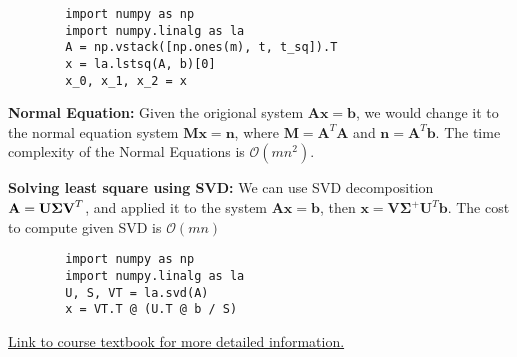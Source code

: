 \documentclass[12pt]{article}
\begin{document}
\begin{verbatim}
        import numpy as np
        import numpy.linalg as la
        A = np.vstack([np.ones(m), t, t_sq]).T
        x = la.lstsq(A, b)[0]
        x_0, x_1, x_2 = x
\end{verbatim}

\medskip
\noindent \textbf{Normal Equation:} Given the origional system $\mathbf{Ax} = \mathbf{b}$, we would change it to the normal equation system $\mathbf{Mx} = \mathbf{n}$, where $\mathbf{M} = \mathbf{A}^T \mathbf{A}$ and $\mathbf{n} = \mathbf{A}^T\mathbf{b}$. The time complexity of the Normal Equations is $\mathcal{O}(mn^2)$.

\medskip
\noindent \textbf{Solving least square using SVD:} We can use SVD decomposition ${\bf A} = {\bf U \Sigma V}^T$, and applied it to the system $\mathbf{Ax} = \mathbf{b}$, then $\mathbf{x} = \mathbf{V \Sigma}^+ \mathbf{U}^T \mathbf{b}$. The cost to compute given SVD is $\mathcal{O}(mn)$

\begin{verbatim}
        import numpy as np
        import numpy.linalg as la
        U, S, VT = la.svd(A)
        x = VT.T @ (U.T @ b / S)
\end{verbatim}

\noindent
\href{https://cs357.github.io/textbook/notes/linear-least-squares.html}{Link to course textbook for more detailed information.}
\end{document}
